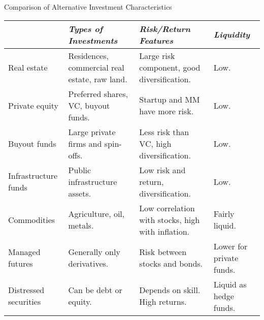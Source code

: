 \documentclass[../custom,grid]{flashcards}
\begin{document}
\begin{flashcard}{Comparison of Alternative Investment Characteristics}
    \begin{tabular}{
        >{\raggedright}p{.8in}
        >{\raggedright}p{1.2in}
        >{\raggedright}p{1.2in}
        >{\raggedright\arraybackslash}p{1in}}
        \toprule
        & \textit{Types of Investments} & \textit{Risk/Return Features} & \textit{Liquidity}\\ \midrule
        Real estate &
        Residences, commercial real estate, raw land. &
        Large risk component, good diversification. &
        Low.\\ \midrule
        Private equity &
        Preferred shares, VC, buyout funds. &
        Startup and MM have more risk. &
        Low.\\ \midrule
        Buyout funds &
        Large private firms and spin-offs. &
        Less risk than VC, high diversification. &
        Low. \\ \midrule
        Infrastructure funds &
        Public infrastructure assets. &
        Low risk and return, diversification. &
        Low. \\ \midrule
        Commodities &
        Agriculture, oil, metals. &
        Low correlation with stocks, high with inflation. &
        Fairly liquid.\\ \midrule
        Managed futures &
        Generally only derivatives. &
        Risk between stocks and bonds. &
        Lower for private funds.\\ \midrule
        Distressed securities &
        Can be debt or equity. &
        Depends on skill. High returns. &
        Liquid as hedge funds.\\ \bottomrule
    \end{tabular}
\end{flashcard}
\end{document}
